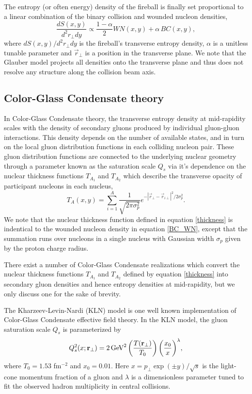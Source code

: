 \documentclass[aps,prc,reprint,amsmath,nofootinbib]{revtex4-1}
\begin{document}
The entropy (or often energy) density of the fireball is finally set proportional to a linear combination of the binary collision and wounded nucleon densities,
\begin{equation}
 \frac{dS(x,y)}{d^2r_\perp dy} \propto \frac{1-\alpha}{2} WN(x,y) + \alpha\, BC(x,y),
\end{equation}
where $dS(x,y)/d^2r_\perp dy$ is the fireball's transverse entropy density, $\alpha$ is a unitless tunable parameter and $\vec{r}_\perp$ is a position in the 
transverse plane. We note that the Glauber model projects all densities onto the transverse plane and thus does not resolve any structure along the collision beam axis.

\subsection{Color-Glass Condensate theory}

In Color-Glass Condensate theory, the transverse entropy density at mid-rapidity scales with the density of secondary gluons produced by individual gluon-gluon interactions.
This density depends on the number of available states, and in turn on the local gluon distribution functions in each colliding nucleon pair. These gluon distribution 
functions are connected to the underlying nuclear geometry through a parameter known as the saturation scale $Q_s$ via it's dependence on the nuclear thickness 
functions $T_{A_1}$ and $T_{A_2}$ which describe the transverse opacity of participant nucleons in each nucleus,
\begin{equation}
 \label{thickness}
 T_A(x,y) = \sum\limits_{i=1}^{A} \frac{1}{\sqrt{2 \pi \sigma^2_p}} e^{ -|\vec{r}_\perp-\vec{r}_{i\perp}|^2/2 \sigma_{p}^2 }.  
\end{equation}
We note that the nuclear thickness function defined in equation \ref{thickness} is indentical to the wounded nucleon density in equation \ref{BC_WN}, except that the 
summation runs over nucleons in a single nucleus with Gaussian width $\sigma_{p}$ given by the proton charge radius.

There exist a number of Color-Glass Condensate realizations which convert the nuclear thickness functions $T_{A_1}$ and $T_{A_2}$ defined by equation \ref{thickness} into 
secondary gluon densities and hence entropy densities at mid-rapidity, but we only discuss one for the sake of brevity.

The Kharzeev-Levin-Nardi (KLN) model is one well known implementation of Color-Glass Condensate effective field theory. In the KLN model, the gluon saturation scale 
$Q_s$ is parameterized by
\begin{equation}
 Q^2_s(x;{\bf r}_\perp) = 2\, \mbox{GeV}^2 \left( \frac{T({\bf r}_\perp)}{T_0} \right) \bigg( \frac{x_0}{x} \bigg)^\lambda,
\end{equation}
where $T_0=1.53$ fm$^{-2}$ and $x_0 = 0.01$. Here $x=p_\perp \exp(\pm y)/\sqrt{s}$ is the light-cone momentum fraction of a gluon and $\lambda$ is a 
dimensionless parameter tuned to fit the observed hadron multiplicity in central collisions.
 
\end{document}
